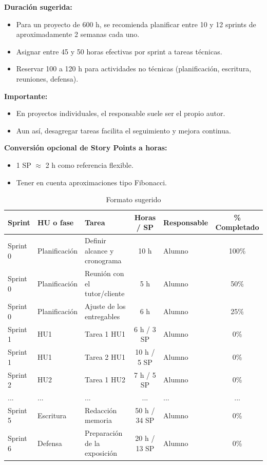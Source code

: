 \documentclass[
11pt, %
]{charter}
\begin{document}
\textbf{Duración sugerida:}
\begin{itemize}
  \item Para un proyecto de 600 h, se recomienda planificar entre 10 y 12 sprints de aproximadamente 2 semanas cada uno.
  \item Asignar entre 45 y 50 horas efectivas por sprint a tareas técnicas.
  \item Reservar 100 a 120 h para actividades no técnicas (planificación, escritura, reuniones, defensa).
\end{itemize}

\textbf{Importante:}
\begin{itemize}
  \item En proyectos individuales, el responsable suele ser el propio autor.
  \item Aun así, desagregar tareas facilita el seguimiento y mejora continua.
\end{itemize}

\textbf{Conversión opcional de Story Points a horas:}
\begin{itemize}
  \item 1 SP \(\approx\) 2 h como referencia flexible.
  \item Tener en cuenta aproximaciones tipo Fibonacci.
\end{itemize}

\begin{table}[htpb]
\centering
\caption{Formato sugerido}
\begin{tabularx}{\linewidth}{@{}|l|l|X|c|l|c|@{}}
\hline
\rowcolor[HTML]{C0C0C0}
Sprint & HU o fase & Tarea & Horas / SP & Responsable & \% Completado \\ \hline
Sprint 0 & Planificación & Definir alcance y cronograma & 10 h & Alumno & 100\% \\ \hline
Sprint 0 & Planificación & Reunión con el tutor/cliente & 5 h & Alumno & 50\% \\ \hline
Sprint 0 & Planificación & Ajuste de los entregables & 6 h & Alumno & 25\% \\ \hline
Sprint 1 & HU1 & Tarea 1 HU1 & 6 h / 3 SP & Alumno & 0\% \\ \hline
Sprint 1 & HU1 & Tarea 2 HU1 & 10 h / 5 SP & Alumno & 0\% \\ \hline
Sprint 2 & HU2 & Tarea 1 HU2 & 7 h / 5 SP & Alumno & 0\% \\ \hline
... & ... & ... & ... & ... & ... \\ \hline
Sprint 5 & Escritura & Redacción memoria & 50 h / 34 SP & Alumno & 0\% \\ \hline
Sprint 6 & Defensa & Preparación de la exposición & 20 h / 13 SP & Alumno & 0\% \\ \hline
\end{tabularx}
\end{table}
\end{document}
